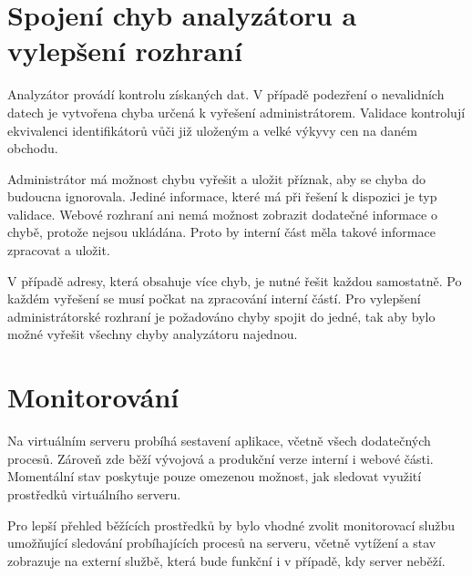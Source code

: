 \documentclass[thesis=B,czech]{FITthesis}[2012/06/26]
\begin{document}
\section{Spojení chyb analyzátoru a vylepšení rozhraní} \label{analyser-join}
Analyzátor provádí kontrolu získaných dat. V případě podezření o nevalidních datech je vytvořena chyba určená k vyřešení
administrátorem. Validace kontrolují ekvivalenci identifikátorů vůči již uloženým a velké výkyvy cen na daném obchodu.
\par
Administrátor má možnost chybu vyřešit a uložit příznak, aby se chyba do budoucna ignorovala. 
Jediné informace, které má při řešení k dispozici je typ validace.
Webové rozhraní ani nemá možnost zobrazit dodatečné informace o chybě, protože nejsou ukládána. Proto by interní část měla takové informace
zpracovat a uložit.
\par
V případě adresy, která obsahuje více chyb, je nutné řešit každou samostatně. Po každém vyřešení se musí počkat na zpracování interní částí.
Pro vylepšení administrátorské rozhraní je požadováno chyby spojit do jedné, tak aby bylo možné vyřešit všechny chyby analyzátoru najednou.

\section{Monitorování}
Na virtuálním serveru probíhá sestavení aplikace, včetně všech dodatečných procesů. Zároveň zde běží vývojová a produkční verze interní i webové části.
Momentální stav poskytuje pouze omezenou možnost, jak sledovat využití prostředků virtuálního serveru.
\par
Pro lepší přehled běžících prostředků by bylo vhodné zvolit monitorovací službu umožňující sledování
probíhajících procesů na serveru, včetně vytížení a stav zobrazuje na externí službě, která bude funkční i v případě, kdy server neběží.
\end{document}
